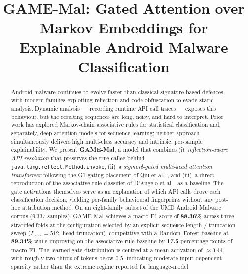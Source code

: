 \documentclass[conference]{IEEEtran}
\begin{document}
\title{GAME-Mal: Gated Attention over Markov Embeddings for\\ Explainable Android Malware Classification}

\author{
}

\maketitle

\begin{abstract}
Android malware continues to evolve faster than classical signature-based
defences, with modern families exploiting reflection and code obfuscation
to evade static analysis. Dynamic analysis — recording runtime API call
traces — exposes this behaviour, but the resulting sequences are long,
noisy, and hard to interpret. Prior work has explored Markov-chain
associative rules for statistical classification and, separately, deep
attention models for sequence learning; neither approach simultaneously
delivers high multi-class accuracy and intrinsic, per-sample
explainability. We present \textbf{GAME-Mal}, a model that combines
(i)~\emph{reflection-aware API resolution} that preserves the true
callee behind \texttt{java.lang.reflect.Method.invoke}, (ii)~a
\emph{sigmoid-gated multi-head attention transformer} following the G1
gating placement of Qiu et al.~\cite{qiu2025gated}, and (iii)~a
direct reproduction of the associative-rule classifier of
D'Angelo et al.~\cite{dangelo2023association} as a baseline. The gate
activations themselves serve as an explanation of which API calls drove
each classification decision, yielding per-family behavioural
fingerprints without any post-hoc attribution method. On an eight-family
subset of the UMD Android Malware corpus (9{,}337 samples), GAME-Mal
achieves a macro F1-score of \textbf{88.36\%} across three
stratified folds at the configuration selected by an explicit
sequence-length / truncation sweep ($L_{\max}{=}512$, head-truncation),
competitive with a Random~Forest baseline at \textbf{89.34\%} while
improving on the associative-rule baseline by \textbf{17.5}
percentage points of macro F1. The learned gate distribution is
centred at a mean activation of $\approx 0.44$, with roughly two
thirds of tokens below $0.5$, indicating moderate input-dependent
sparsity rather than the extreme regime reported for language-model

\end{abstract}
\end{document}
